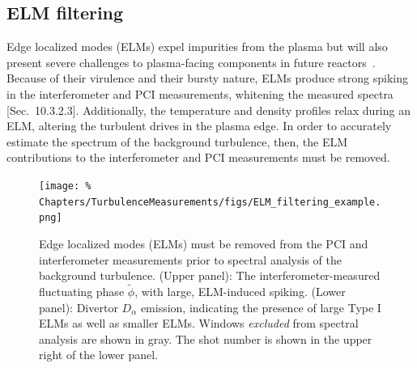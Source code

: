 \subsection{ELM filtering}
\label{sec:TurbulenceMeasurements:ELM_filtering}
Edge localized modes (ELMs) expel impurities from the plasma but
will also present severe challenges to plasma-facing components
in future reactors~\cite[Sec.~7.17]{wesson}.
Because of their virulence and their bursty nature,
ELMs produce strong spiking in the interferometer and PCI measurements,
whitening the measured spectra
[Sec.~10.3.2.3]\cite{bendat_and_piersol}.
Additionally, the temperature and density profiles relax during an ELM,
altering the turbulent drives in the plasma edge.
In order to accurately estimate
the spectrum of the background turbulence, then,
the ELM contributions to the interferometer and PCI measurements
must be removed.

\begin{figure}
  \centering
  \texttt{[image: \%
    Chapters/TurbulenceMeasurements/figs/ELM\_filtering\_example.png]}
  \caption[ELM filtering]{%
    Edge localized modes (ELMs) must be removed
    from the PCI and interferometer measurements
    prior to spectral analysis of the background turbulence.
    (Upper panel): The interferometer-measured
    fluctuating phase $\tilde{\phi}$,
    with large, ELM-induced spiking.
    (Lower panel): Divertor $D_{\alpha}$ emission,
    indicating the presence of large Type I ELMs
    as well as smaller ELMs.
    Windows \emph{excluded} from spectral analysis are shown in gray.
    The \diiid\space shot number is shown in the upper right
    of the lower panel.
  }
\label{fig:TurbulenceMeasurements:ELM_filtering_example}
\end{figure}

